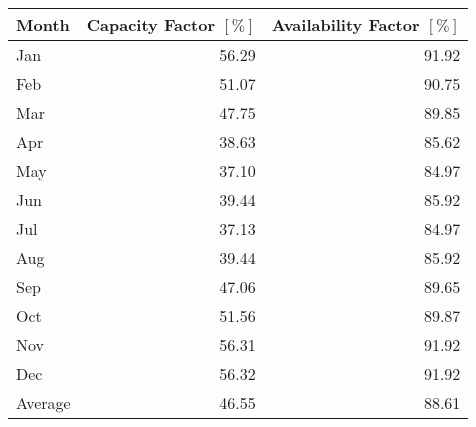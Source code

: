 \begin{tabular}{lrr}
\toprule
   Month &  Capacity Factor $[\%]$ &  Availability Factor $[\%]$ \\
\midrule
     Jan &                   56.29 &                       91.92 \\
     Feb &                   51.07 &                       90.75 \\
     Mar &                   47.75 &                       89.85 \\
     Apr &                   38.63 &                       85.62 \\
     May &                   37.10 &                       84.97 \\
     Jun &                   39.44 &                       85.92 \\
     Jul &                   37.13 &                       84.97 \\
     Aug &                   39.44 &                       85.92 \\
     Sep &                   47.06 &                       89.65 \\
     Oct &                   51.56 &                       89.87 \\
     Nov &                   56.31 &                       91.92 \\
     Dec &                   56.32 &                       91.92 \\
 Average &                   46.55 &                       88.61 \\
\bottomrule
\end{tabular}
